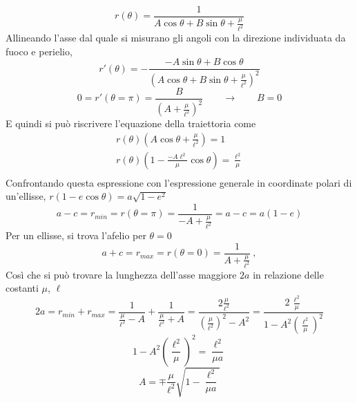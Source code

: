 \begin{equation}
    r(\theta) = \frac{1}{A \cos \theta + B \sin \theta + \frac{\mu}{\ell^2}} 
\end{equation}
Allineando l'asse dal quale si misurano gli angoli con la direzione individuata da fuoco e perielio,
\begin{equation}
    r'(\theta) = - \dfrac{-A \sin \theta + B \cos \theta}{\left(A \cos \theta + B \sin \theta + \frac{\mu}{\ell^2}\right)^2}
\end{equation}
\begin{equation}
    0 = r'(\theta=\pi) = \dfrac{B}{\left(A  + \frac{\mu}{\ell^2}\right)^2} \qquad \rightarrow \qquad B = 0
\end{equation}
E quindi si può riscrivere l'equazione della traiettoria come
\begin{equation}
\begin{aligned}
    r(\theta) \left( A \cos \theta + \frac{\mu}{\ell^2} \right) = 1 \\ 
    r(\theta) \left( 1 - \frac{-A \ell^2}{\mu} \cos \theta \right) = \frac{\ell^2}{\mu} \\ 
\end{aligned}
\end{equation}
Confrontando questa espressione con l'espressione generale in coordinate polari di un'ellisse, $r (1 - e \cos \theta) = a \sqrt{1 - e^2}$
\begin{equation}
    a - c = r_{min} = r(\theta = \pi) = \dfrac{1}{-A + \frac{\mu}{\ell^2}} = a - c = a ( 1 - e)
\end{equation}
Per un ellisse, si trova l'afelio per $\theta = 0$
\begin{equation}
    a + c = r_{max} = r(\theta = 0) = \dfrac{1}{A + \frac{\mu}{\ell^2}} \ ,
\end{equation}
Così che si può trovare la lunghezza dell'asse maggiore $2a$ in relazione delle costanti $\mu$, $\ell$
\begin{equation}
   2 a = r_{min} + r_{max} = \dfrac{1}{\frac{\mu}{\ell^2} - A} + \dfrac{1}{\frac{\mu}{\ell^2} + A} =
    \dfrac{2 \frac{\mu}{\ell^2}}{\left( \frac{\mu}{\ell^2}  \right)^2 - A^2} = \dfrac{2 \, \frac{\ell^2}{\mu}}{1 - A^2 \left( \frac{\ell^2}{\mu} \right)^2}
\end{equation}
\begin{equation}
    1 - A^2 \left( \dfrac{\ell^2}{\mu} \right)^2 = \frac{\ell^2}{\mu a}
\end{equation}
\begin{equation}
    A = \mp \frac{\mu}{\ell^2} \sqrt{1 - \frac{\ell^2}{\mu a}}
\end{equation}

